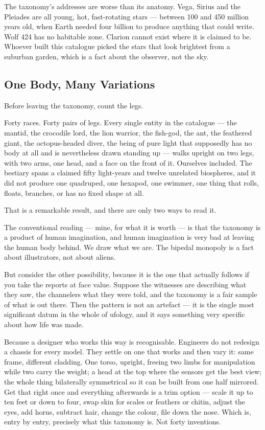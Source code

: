 \begin{funfact}
The taxonomy's addresses are worse than its anatomy. Vega, Sirius and the Pleiades are all
young, hot, fast-rotating stars --- between 100 and 450 million years old, when Earth needed
four billion to produce anything that could write. Wolf 424 has no habitable zone. Clarion
cannot exist where it is claimed to be. Whoever built this catalogue picked the stars that
look brightest from a suburban garden, which is a fact about the observer, not the sky.
\end{funfact}

\subsection{One Body, Many Variations}\label{sec:onebody}

Before leaving the taxonomy, count the legs.

Forty races. Forty pairs of legs. Every single entity in the catalogue ---
the mantid, the crocodile lord, the lion warrior, the fish-god, the ant, the feathered
giant, the octopus-headed diver, the being of pure light that supposedly has no body at all and is nevertheless drawn
standing up --- walks upright on two legs, with two arms, one head, and a face on the front
of it. Ourselves included. The bestiary spans a claimed fifty light-years and twelve
unrelated biospheres, and it did not produce one quadruped, one hexapod, one swimmer, one
thing that rolls, floats, branches, or has no fixed shape at all.

That is a remarkable result, and there are only two ways to read it.

The conventional reading --- mine, for what it is worth --- is that the taxonomy is a product
of human imagination, and human imagination is very bad at leaving the human body behind.
We draw what we are. The bipedal monopoly is a fact about illustrators, not about aliens.

But consider the other possibility, because it is the one that actually follows if you take
the reports at face value.  Suppose the witnesses
are describing what they saw, the channelers what they were told, and the taxonomy is a fair
sample of what is out there. Then the pattern is not an artefact --- it is the single most
significant datum in the whole of ufology, and it says something very specific about how
life was made.

Because a designer who works this way is recognisable. Engineers do not redesign a chassis
for every model. They settle on one that works and then vary it: same frame, different
cladding.  One torso, upright, freeing two limbs for manipulation while two carry the weight;
a head at the top where the sensors get the best view; the whole thing bilaterally
symmetrical so it can be built from one half mirrored. Get that right once and everything
afterwards is a trim option --- scale it up to ten feet or down to four, swap skin for
scales or feathers or chitin, adjust the eyes, add horns, subtract hair, change the colour,
file down the nose. Which is, entry by entry, precisely what this taxonomy is. Not
forty inventions. 

